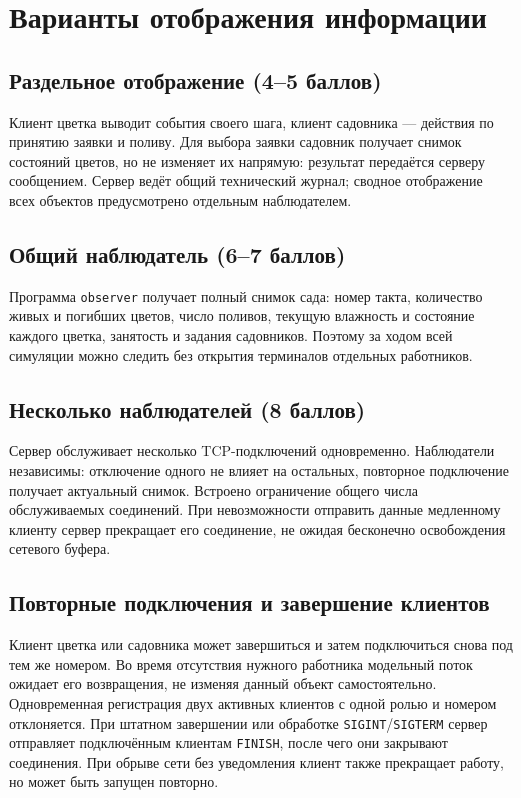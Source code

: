 \documentclass[12pt,a4paper]{article}
\begin{document}
\section{Варианты отображения информации}
\subsection{Раздельное отображение (4--5 баллов)}
Клиент цветка выводит события своего шага, клиент садовника --- действия по принятию заявки и поливу. Для выбора заявки садовник получает снимок состояний цветов, но не изменяет их напрямую: результат передаётся серверу сообщением. Сервер ведёт общий технический журнал; сводное отображение всех объектов предусмотрено отдельным наблюдателем.

\subsection{Общий наблюдатель (6--7 баллов)}
Программа \texttt{observer} получает полный снимок сада: номер такта, количество живых и погибших цветов, число поливов, текущую влажность и состояние каждого цветка, занятость и задания садовников. Поэтому за ходом всей симуляции можно следить без открытия терминалов отдельных работников.

\subsection{Несколько наблюдателей (8 баллов)}
Сервер обслуживает несколько TCP-подключений одновременно. Наблюдатели независимы: отключение одного не влияет на остальных, повторное подключение получает актуальный снимок. Встроено ограничение общего числа обслуживаемых соединений. При невозможности отправить данные медленному клиенту сервер прекращает его соединение, не ожидая бесконечно освобождения сетевого буфера.

\subsection{Повторные подключения и завершение клиентов}
Клиент цветка или садовника может завершиться и затем подключиться снова под тем же номером. Во время отсутствия нужного работника модельный поток ожидает его возвращения, не изменяя данный объект самостоятельно. Одновременная регистрация двух активных клиентов с одной ролью и номером отклоняется. При штатном завершении или обработке \texttt{SIGINT}/\texttt{SIGTERM} сервер отправляет подключённым клиентам \texttt{FINISH}, после чего они закрывают соединения. При обрыве сети без уведомления клиент также прекращает работу, но может быть запущен повторно.
\end{document}
